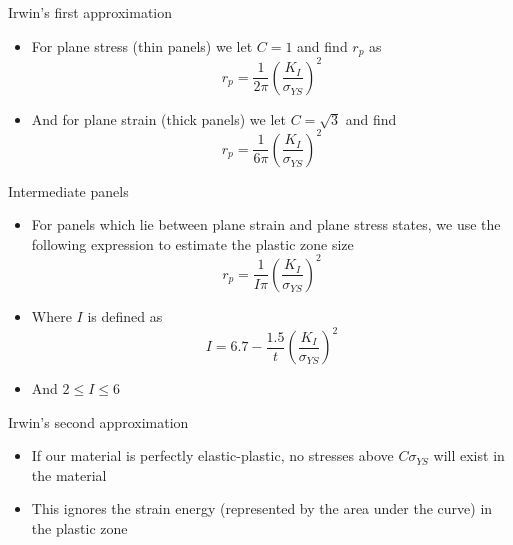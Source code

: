 \documentclass[10pt,handout]{beamer}
\begin{document}
\begin{frame}{Irwin's first approximation}
	\begin{itemize}
		\item For plane stress (thin panels) we let $C=1$ and find $r_p$ as
		\begin{equation}
		r_p = \frac{1}{2\pi} \left(\frac{K_I}{\sigma_{YS}}\right)^2
		\end{equation}
		\pause
		\item And for plane strain (thick panels) we let $C=\sqrt{3}$ and find
		\begin{equation}
		r_p = \frac{1}{6\pi} \left(\frac{K_I}{\sigma_{YS}}\right)^2
		\end{equation}
	\end{itemize}
\end{frame}

\begin{frame}{Intermediate panels}
	\begin{itemize}
		\item For panels which lie between plane strain and plane stress states, we use the following expression to estimate the plastic zone size
		\begin{equation}
		r_p = \frac{1}{I\pi} \left(\frac{K_I}{\sigma_{YS}}\right)^2
		\end{equation}
		\pause
		\item Where $I$ is defined as
		\begin{equation}
		I = 6.7 - \frac{1.5}{t}\left(\frac{K_I}{\sigma_{YS}}\right)^2
		\end{equation}
		\item And $2 \le I \le 6$
	\end{itemize}
\end{frame}

\begin{frame}{Irwin's second approximation}
	\begin{itemize}
		\item If our material is perfectly elastic-plastic, no stresses above $C\sigma_{YS}$ will exist in the material
		\item This ignores the strain energy (represented by the area under the curve) in the plastic zone
	\end{itemize}
\end{frame}
\end{document}
